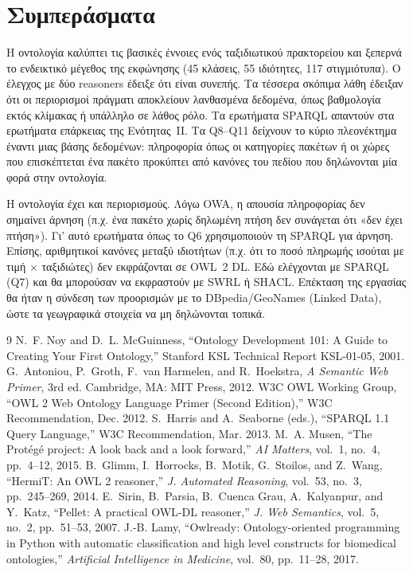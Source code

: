 \documentclass[conference]{IEEEtran}
\begin{document}
\section{Συμπεράσματα}

Η οντολογία καλύπτει τις βασικές έννοιες ενός ταξιδιωτικού πρακτορείου και
ξεπερνά το ενδεικτικό μέγεθος της εκφώνησης (45 κλάσεις, 55 ιδιότητες,
117 στιγμιότυπα). Ο έλεγχος με δύο reasoners έδειξε ότι είναι συνεπής. Τα τέσσερα
σκόπιμα λάθη έδειξαν ότι οι περιορισμοί πράγματι αποκλείουν λανθασμένα δεδομένα,
όπως βαθμολογία εκτός κλίμακας ή υπάλληλο σε λάθος ρόλο. Τα ερωτήματα SPARQL
απαντούν στα ερωτήματα επάρκειας της Ενότητας~II. Τα Q8--Q11 δείχνουν το κύριο
πλεονέκτημα έναντι μιας βάσης δεδομένων: πληροφορία όπως οι κατηγορίες πακέτων ή οι
χώρες που επισκέπτεται ένα πακέτο προκύπτει από κανόνες του πεδίου που
δηλώνονται μία φορά στην οντολογία.

Η οντολογία έχει και περιορισμούς. Λόγω OWA, η απουσία πληροφορίας δεν σημαίνει
άρνηση (π.χ. ένα πακέτο χωρίς δηλωμένη πτήση δεν συνάγεται ότι «δεν έχει πτήση»).
Γι' αυτό ερωτήματα όπως το Q6 χρησιμοποιούν τη SPARQL για άρνηση. Επίσης,
αριθμητικοί κανόνες μεταξύ ιδιοτήτων (π.χ. ότι το ποσό πληρωμής ισούται με τιμή
$\times$ ταξιδιώτες) δεν εκφράζονται σε OWL~2 DL. Εδώ ελέγχονται με SPARQL (Q7) και θα
μπορούσαν να εκφραστούν με SWRL ή SHACL. Επέκταση της εργασίας θα ήταν η
σύνδεση των προορισμών με το DBpedia/GeoNames (Linked Data), ώστε τα γεωγραφικά
στοιχεία να μη δηλώνονται τοπικά.

\begin{thebibliography}{9}
 N.~F. Noy and D.~L. McGuinness, ``Ontology Development 101: A Guide
to Creating Your First Ontology,'' Stanford KSL Technical Report KSL-01-05, 2001.
 G.~Antoniou, P.~Groth, F.~van Harmelen, and R.~Hoekstra,
\textit{A Semantic Web Primer}, 3rd ed. Cambridge, MA: MIT Press, 2012.
 W3C OWL Working Group, ``OWL 2 Web Ontology Language Primer
(Second Edition),'' W3C Recommendation, Dec. 2012.
 S.~Harris and A.~Seaborne (eds.), ``SPARQL 1.1 Query Language,''
W3C Recommendation, Mar. 2013.
 M.~A. Musen, ``The Protégé project: A look back and a look
forward,'' \textit{AI Matters}, vol.~1, no.~4, pp.~4--12, 2015.
 B.~Glimm, I.~Horrocks, B.~Motik, G.~Stoilos, and Z.~Wang, ``HermiT:
An OWL 2 reasoner,'' \textit{J. Automated Reasoning}, vol.~53, no.~3,
pp.~245--269, 2014.
 E.~Sirin, B.~Parsia, B.~Cuenca Grau, A.~Kalyanpur, and Y.~Katz,
``Pellet: A practical OWL-DL reasoner,'' \textit{J. Web Semantics}, vol.~5, no.~2,
pp.~51--53, 2007.
 J.-B. Lamy, ``Owlready: Ontology-oriented programming in Python
with automatic classification and high level constructs for biomedical
ontologies,'' \textit{Artificial Intelligence in Medicine}, vol.~80, pp.~11--28, 2017.
\end{thebibliography}
\end{document}
